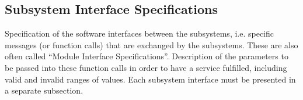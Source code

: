 \subsection{Subsystem Interface Specifications}

Specification of the software interfaces between the subsystems,
i.e. specific messages (or function calls) that are exchanged by the subsystems.
These are also often called ``Module Interface Specifications''.
Description of the parameters to be passed into these function calls in order to have a service fulfilled,
including valid and invalid ranges of values.
Each subsystem interface must be presented in a separate subsection.
